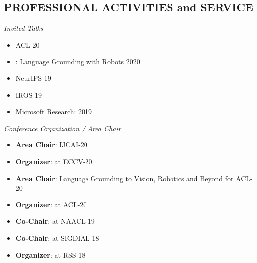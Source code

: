 \documentclass{res}
\newcommand{\citehref}[2]{\href{#1}{\color{darkblue}{#2}}}
\begin{document}
\begin{resume}
\section{PROFESSIONAL ACTIVITIES and SERVICE}

{\sl Invited Talks}
  \begin{itemize}
    \item \citehref{https://sites.google.com/view/2ndnlp4convai/}{Workshop on NLP for Conversational AI} \hfill ACL-20
    \item \citehref{https://www.cs.princeton.edu/courses/archive/spring20/cos598C/}{Princeton COS 598C}: Language Grounding with Robots \hfill 2020
    \item \citehref{https://vigilworkshop.github.io/}{Visually Grounded Interaction and Language (ViGIL) Workshop} \hfill NeurIPS-19
    \item \citehref{https://sites.google.com/view/spar2019/speakers}{Semantic Policy and Action Representations for Autonomous Robots (SPAR) Workshop} \hfill IROS-19
    \item Microsoft Research: \citehref{https://www.youtube.com/watch?v=XL3FMpceYoE}{Vision-and-Dialog Navigation} \hfill 2019
  \end{itemize}

{\sl Conference Organization / Area Chair}
  \begin{itemize}
    \item \textbf{Area Chair}: IJCAI-20
    \item \textbf{Organizer}: \citehref{https://askforalfred.com/EVAL/}{Embodied Vision, Actions \& Language Workshop (EVAL)} at ECCV-20
    \item \textbf{Area Chair}: Language Grounding to Vision, Robotics and Beyond for ACL-20
    \item \textbf{Organizer}: \citehref{https://alvr-workshop.github.io/}{First Workshop on Advances in Language and Vision Research (ALVR)} at ACL-20
    \item \textbf{Co-Chair}: \citehref{https://splu-robonlp.github.io/}{Combined Workshop on Spatial Language Understanding (SpLU) and Grounded Communication for Robotics (RoboNLP)} at NAACL-19
    \item \textbf{Co-Chair}: \citehref{https://robodial.github.io/}{Special Session on Physically Situated Dialog (RoboDIAL)} at SIGDIAL-18
    \item \textbf{Organizer}: \citehref{http://www2.ece.rochester.edu/projects/rail/mrhrc2018/}{Workshop on Communicating with Robots Naturally (CWRN)} at RSS-18
  \end{itemize}


\end{resume}
\end{document}
